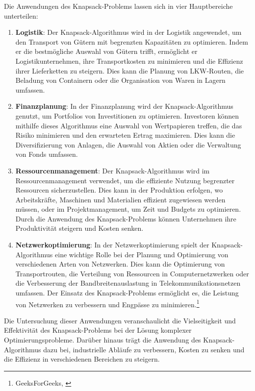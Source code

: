 Die Anwendungen des Knapsack-Problems lassen sich in vier Hauptbereiche unterteilen:
\begin{enumerate}
\item \textbf{Logistik}: Der Knapsack-Algorithmus wird in der Logistik angewendet, um den Transport von Gütern mit
begrenzten Kapazitäten zu optimieren. Indem er die bestmögliche Auswahl von Gütern trifft, ermöglicht er Logistikunternehmen,
ihre Transportkosten zu minimieren und die Effizienz ihrer Lieferketten zu steigern. Dies kann die Planung von LKW-Routen,
die Beladung von Containern oder die Organisation von Waren in Lagern umfassen.
\item \textbf{Finanzplanung}: In der Finanzplanung wird der Knapsack-Algorithmus genutzt, um Portfolios von Investitionen
zu optimieren. Investoren können mithilfe dieses Algorithmus eine Auswahl von Wertpapieren treffen, die das Risiko
minimieren und den erwarteten Ertrag maximieren. Dies kann die Diversifizierung von Anlagen, die Auswahl von Aktien
oder die Verwaltung von Fonds umfassen.
\item \textbf{Ressourcenmanagement}: Der Knapsack-Algorithmus wird im Ressourcenmanagement verwendet, um die effiziente
Nutzung begrenzter Ressourcen sicherzustellen. Dies kann in der Produktion erfolgen, wo Arbeitskräfte, Maschinen und
Materialien effizient zugewiesen werden müssen, oder im Projektmanagement, um Zeit und Budgets zu optimieren. Durch
die Anwendung des Knapsack-Problems können Unternehmen ihre Produktivität steigern und Kosten senken.
\item \textbf{Netzwerkoptimierung}: In der Netzwerkoptimierung spielt der Knapsack-Algorithmus eine wichtige Rolle
bei der Planung und Optimierung von verschiedenen Arten von Netzwerken. Dies kann die Optimierung von Transportrouten,
die Verteilung von Ressourcen in Computernetzwerken oder die Verbesserung der Bandbreitenauslastung in Telekommunikationsnetzen
umfassen. Der Einsatz des Knapsack-Problems ermöglicht es, die Leistung von Netzwerken zu verbessern und Engpässe zu
minimieren.\footnote{GeeksForGeeks, \cite{Introduction to Knapsack Problem, its Types and How to solve them}}
\end{enumerate}

Die Untersuchung dieser Anwendungen veranschaulicht die Vielseitigkeit und Effektivität des Knapsack-Problems bei der Lösung
komplexer Optimierungsprobleme. Darüber hinaus trägt die Anwendung des Knapsack-Algorithmus dazu bei, industrielle Abläufe
zu verbessern, Kosten zu senken und die Effizienz in verschiedenen Bereichen zu steigern.


